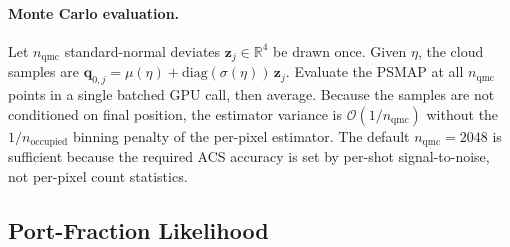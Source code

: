 \documentclass[11pt,a4paper]{article}
\newcommand{\q}{\mathbf{q}}
\begin{document}
\paragraph{Monte Carlo evaluation.}
Let $n_\mathrm{qmc}$ standard-normal deviates $\mathbf{z}_j\!\in\!\mathbb{R}^4$
be drawn once.  Given $\eta$, the cloud samples are
$\q_{0,j}=\mu(\eta)+\mathrm{diag}(\sigma(\eta))\,\mathbf{z}_j$.  Evaluate the
PSMAP at all $n_\mathrm{qmc}$ points in a single batched GPU call, then
average.  Because the samples are not conditioned on final position, the
estimator variance is $\mathcal{O}(1/n_\mathrm{qmc})$ without the
$1/n_\mathrm{occupied}$ binning penalty of the per-pixel estimator.  The default
$n_\mathrm{qmc}=2048$ is sufficient because the required ACS accuracy is set by
per-shot signal-to-noise, not per-pixel count statistics.

\subsection{Port-Fraction Likelihood}
\label{sec:port_frac}
\end{document}
